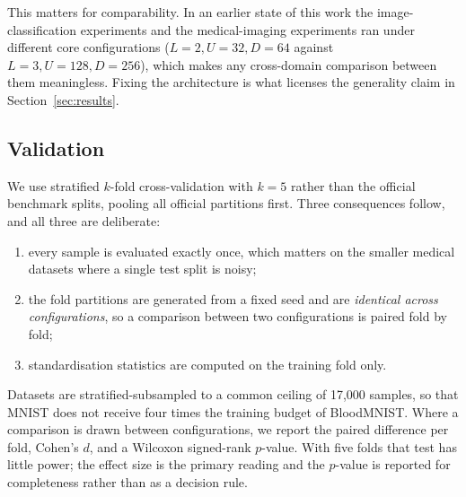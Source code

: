 This matters for comparability. In an earlier state of this
work the image-classification experiments and the medical-imaging experiments
ran under different core configurations ($L=2, U=32, D=64$ against
$L=3, U=128, D=256$), which makes any cross-domain comparison between them
meaningless. Fixing the architecture is what licenses the generality claim in
Section~\ref{sec:results}.

\subsection{Validation}

We use stratified $k$-fold cross-validation with $k=5$ rather than the official
benchmark splits, pooling all official partitions first. Three consequences
follow, and all three are deliberate:

\begin{enumerate}[leftmargin=*, itemsep=1pt, topsep=2pt]
  \item every sample is evaluated exactly once, which matters on the smaller
        medical datasets where a single test split is noisy;
  \item the fold partitions are generated from a fixed seed and are
        \emph{identical across configurations}, so a comparison between two
        configurations is paired fold by fold;
  \item standardisation statistics are computed on the training fold only.
\end{enumerate}

Datasets are stratified-subsampled to a common ceiling of 17{,}000 samples, so
that MNIST does not receive four times the training budget of BloodMNIST. Where
a comparison is drawn between configurations, we report the paired difference
per fold, Cohen's $d$, and a Wilcoxon signed-rank $p$-value. With five folds
that test has little power; the effect size is the primary reading and the
$p$-value is reported for completeness rather than as a decision rule.

